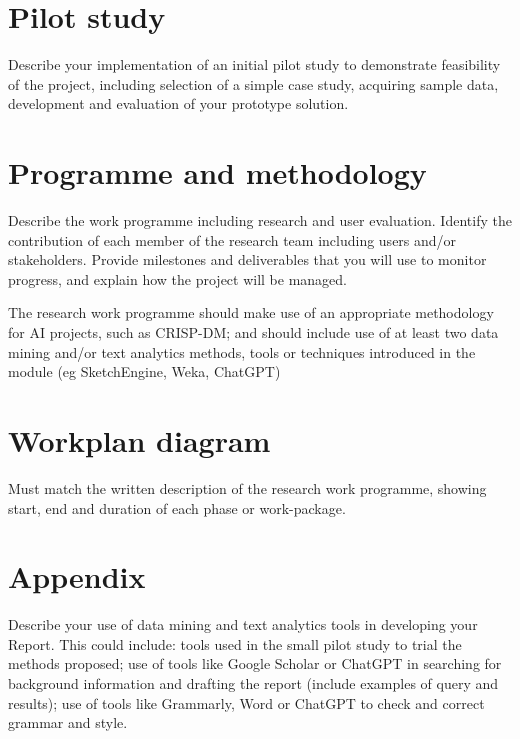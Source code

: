 \documentclass[a4paper, 11pt]{article}
\begin{document}
\pagebreak
\section{Pilot study}
Describe your implementation of an initial pilot study to demonstrate feasibility of the project, including selection of a simple case study, acquiring sample data, development and evaluation of your prototype solution.

\pagebreak
\section{Programme and methodology}
Describe the work programme including research and user
evaluation. Identify the contribution of each member of the research team including users and/or stakeholders. Provide milestones and deliverables that you will use to monitor progress, and explain how the project will be managed.

The research work programme should make use of an appropriate methodology for AI projects, such as CRISP-DM; and should include use of at least two data mining and/or text analytics methods, tools or techniques introduced in the module (eg SketchEngine, Weka, ChatGPT)

\pagebreak
\section{Workplan diagram}
Must match the written description of the research work programme, showing start, end and duration of each phase or work-package.

\pagebreak
\appendix
\section{Appendix}
Describe your use of data mining and text analytics tools in developing your Report. This could include: tools used in the small pilot study to trial the methods proposed; use of tools like Google Scholar or ChatGPT in searching for background information and drafting the report (include examples of query and results); use of tools like Grammarly, Word or ChatGPT to check and correct grammar and style.


\pagebreak


\end{document}
